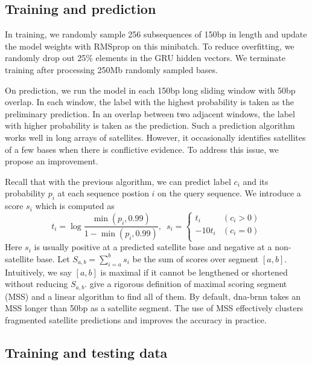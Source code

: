 \documentclass{bioinfo}
\begin{document}
\begin{methods}
\subsection{Training and prediction}

In training, we randomly sample 256 subsequences of 150bp in length and update
the model weights with RMSprop on this minibatch. To reduce overfitting, we
randomly drop out 25\% elements in the GRU hidden vectors. We terminate
training after processing 250Mb randomly sampled bases.

On prediction, we run the model in each 150bp long sliding window with 50bp
overlap. In each window, the label with the highest probability is taken as the
preliminary prediction. In an overlap between two adjacent windows, the label
with higher probability is taken as the prediction. Such a prediction
algorithm works well in long arrays of satellites. However, it occasionally
identifies satellites of a few bases when there is conflictive evidence. To
address this issue, we propose an improvement.

Recall that with the previous algorithm, we can predict label $c_i$ and its
probability $p_i$ at each sequence postion $i$ on the query sequence. We
introduce a score $s_i$ which is computed as
\begin{equation}\label{eq:sc}
t_i=\log\frac{\min(p_i,0.99)}{1-\min(p_i,0.99)},\,\,\,
s_i=\left\{\begin{array}{ll}
t_i & (c_i>0) \\
-10t_i & (c_i=0)\\
\end{array}\right.
\end{equation}
Here $s_i$ is usually positive at a predicted satellite base and negative at a
non-satellite base. Let $S_{a,b}=\sum_{i=a}^b s_i$
be the sum of scores over segment $[a,b]$. Intuitively, we say $[a,b]$ is
maximal if it cannot be lengthened or shortened without reducing $S_{a,b}$.
\citet{DBLP:conf/ismb/RuzzoT99} give a rigorous definition of maximal scoring
segment (MSS) and a linear algorithm to find all of them. By default,
dna-brnn takes an MSS longer than 50bp as a satellite segment. The use of MSS
effectively clusters fragmented satellite predictions and improves the accuracy
in practice.

\subsection{Training and testing data}


\end{methods}
\end{document}
